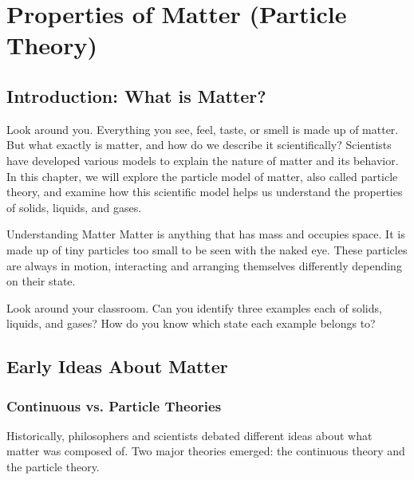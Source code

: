 \chapter{Properties of Matter (Particle Theory)}

\section{Introduction: What is Matter?}


Look around you. Everything you see, feel, taste, or smell is made up of matter. But what exactly is matter, and how do we describe it scientifically? Scientists have developed various models to explain the nature of matter and its behavior. In this chapter, we will explore the particle model of matter, also called particle theory, and examine how this scientific model helps us understand the properties of solids, liquids, and gases.

\begin{keyconcept}{Understanding Matter}
Matter is anything that has mass and occupies space. It is made up of tiny particles too small to be seen with the naked eye. These particles are always in motion, interacting and arranging themselves differently depending on their state.
\end{keyconcept}

\begin{stopandthink}
Look around your classroom. Can you identify three examples each of solids, liquids, and gases? How do you know which state each example belongs to?
\end{stopandthink}

\section{Early Ideas About Matter}

\subsection{Continuous vs. Particle Theories}

Historically, philosophers and scientists debated different ideas about what matter was composed of. Two major theories emerged: the continuous theory and the particle theory.


